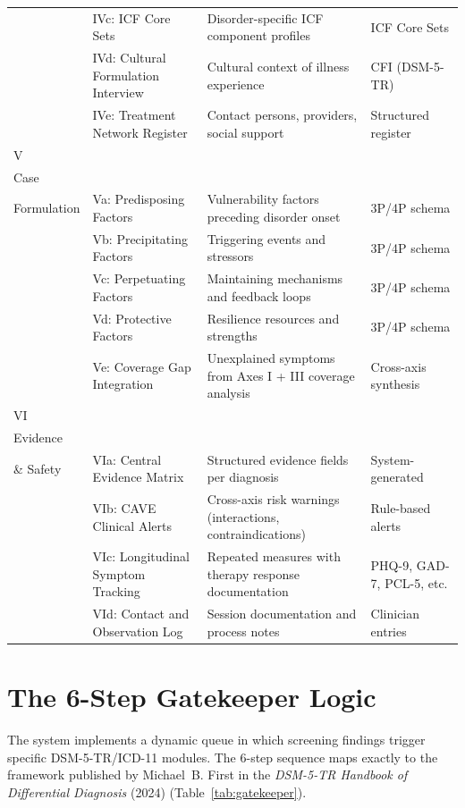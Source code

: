 \documentclass[11pt,a4paper]{article}
\begin{document}
\begin{longtable}{@{}L{1.8cm}L{2.4cm}L{5.0cm}L{4.0cm}@{}}
 & IVc: ICF Core Sets & Disorder-specific ICF component profiles & ICF Core Sets \\
 & IVd: Cultural Formulation Interview & Cultural context of illness experience & CFI (DSM-5-TR) \\
 & IVe: Treatment Network Register & Contact persons, providers, social support & Structured register \\
\midrule
V\\Case\\Formulation & Va: Predisposing Factors & Vulnerability factors preceding disorder onset & 3P/4P schema \\
 & Vb: Precipitating Factors & Triggering events and stressors & 3P/4P schema \\
 & Vc: Perpetuating Factors & Maintaining mechanisms and feedback loops & 3P/4P schema \\
 & Vd: Protective Factors & Resilience resources and strengths & 3P/4P schema \\
 & Ve: Coverage Gap Integration & Unexplained symptoms from Axes I + III coverage analysis & Cross-axis synthesis \\
\midrule
VI\\Evidence\\\& Safety & VIa: Central Evidence Matrix & Structured evidence fields per diagnosis & System-generated \\
 & VIb: CAVE Clinical Alerts & Cross-axis risk warnings (interactions, contraindications) & Rule-based alerts \\
 & VIc: Longitudinal Symptom Tracking & Repeated measures with therapy response documentation & PHQ-9, GAD-7, PCL-5, etc. \\
 & VId: Contact and Observation Log & Session documentation and process notes & Clinician entries \\
\end{longtable}
\normalsize

\section{The 6-Step Gatekeeper Logic}
\label{sec:gatekeeper}

The system implements a dynamic queue in which screening findings trigger specific DSM-5-TR/ICD-11 modules. The 6-step sequence maps exactly to the framework published by Michael~B. First in the \textit{DSM-5-TR Handbook of Differential Diagnosis} (2024) (Table~\ref{tab:gatekeeper}).
\end{document}

